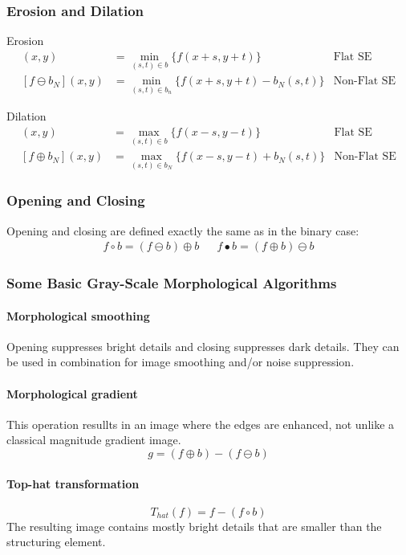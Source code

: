 \subsubsection{Erosion and Dilation}
Erosion
\begin{align*}
	[f\ominus b](x,y)	&= \min_{(s,t)\in b} \{f(x+s,y+t)\}				& \text{Flat SE} \\
	[f\ominus b_N](x,y)	&= \min_{(s,t)\in b_n} \{f(x+s,y+t) -b_N(s,t)\}	& \text{Non-Flat SE}
\end{align*}

Dilation
\begin{align*}
	[f\oplus b](x,y)	&= \max_{(s,t)\in b} \{f(x-s,y-t)\}				& \text{Flat SE} \\
	[f\oplus b_N](x,y)	&= \max_{(s,t)\in b_N} \{f(x-s,y-t) +b_N(s,t)\}	& \text{Non-Flat SE}
\end{align*}

\subsubsection{Opening and Closing}
Opening and closing are defined exactly the same as in the binary case:
\begin{align*}
	f \circ b = (f \ominus b) \oplus b &&
	f  \bullet b = (f \oplus b) \ominus b
\end{align*}

\subsubsection{Some Basic Gray-Scale Morphological Algorithms}
\paragraph{Morphological smoothing}
Opening suppresses bright details and closing suppresses dark details. They can be used in combination for image smoothing and/or noise suppression.
\paragraph{Morphological gradient}
This operation resullts in an image where the edges are enhanced, not unlike a classical magnitude gradient image.
\[
	g=(f\oplus b)-(f\ominus b)
\]
\paragraph{Top-hat transformation}
\[
	T_{hat}(f) = f -(f \circ b)
\]
The resulting image contains mostly bright details that are smaller than the structuring element.
